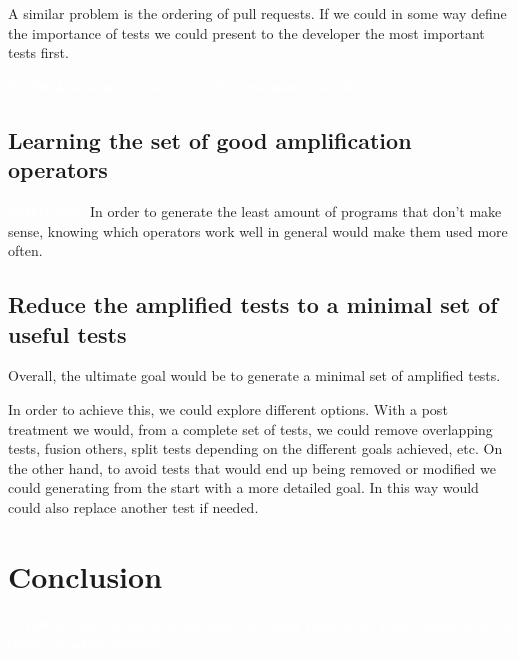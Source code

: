 \documentclass[11pt]{sdm}
\newcommand{\todo}[1]{\colorbox{Red!75}{\textcolor{white}{\textbf{TODO\ifx&#1&\else: #1\fi}}}}
\begin{document}
A similar problem is the ordering of pull requests.
If we could in some way define the importance of tests we could present to the developer the most important tests first.

\todo{how would we do it?}

\subsection{Learning the set of good amplification operators}
\label{learning}
\todo{}
In order to generate the least amount of programs that don't make sense, knowing which operators work well in general would make them used more often.

\subsection{Reduce the amplified tests to a minimal set of useful tests}
\label{minimal}
Overall, the ultimate goal would be to generate a minimal set of amplified tests.

In order to achieve this, we could explore different options.
With a post treatment we would, from a complete set of tests, we could remove overlapping tests, fusion others, split tests depending on the different goals achieved, etc.
On the other hand, to avoid tests that would end up being removed or modified we could generating from the start with a more detailed goal.
In this way would could also replace another test if needed.


\section*{Conclusion}
\label{conclu}
\todo{recall what will be done, in what context}




\end{document}
